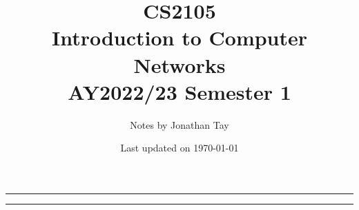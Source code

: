 \documentclass{article}
\title{\vspace{-1cm}\textbf{CS2105 \\[0.25em] Introduction to Computer Networks} \\[2em] \Large AY2022/23 Semester 1 \\[1em]}
\author{Notes by Jonathan Tay}
\date{Last updated on \today}
\newcommand{\pageline}[1]{\par\noindent\rule{\textwidth}{#1}}
\begin{document}
    \maketitle
    \pageline{1.5pt}
    \renewcommand{\baselinestretch}{0.75}\normalsize
    \tableofcontents
    \renewcommand{\baselinestretch}{1.1}\normalsize
    \pageline{1.5pt}

    \newpage
    \begin{multicols*}{2}
        
        
    \end{multicols*}
\end{document}
